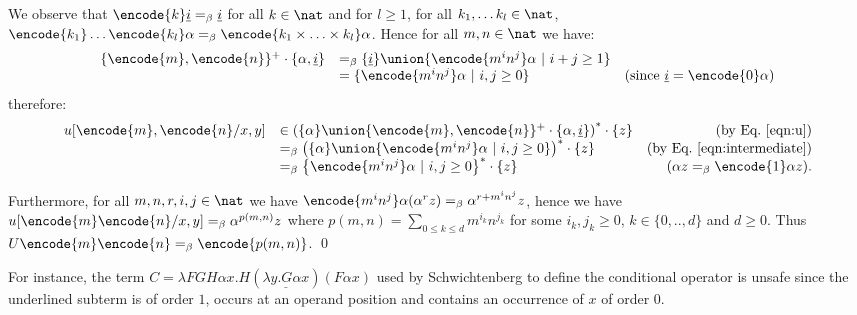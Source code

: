 We observe that $\encode{k} \underline{i} =_\beta \underline{i}$ for
all $k \in \nat$ and for $l\geq 1$, for all $k_1, \ldots k_l \in
\nat$, $\encode{k_1}\ldots \encode{k_l} \alpha =_\beta
\encode{k_1\times \ldots \times k_l} \alpha$. Hence for all $m,n \in
\nat$ we have:
\begin{equation}
\begin{array}{llr}
\{\encode{m},\encode{n}\}^+ \cdot \{\alpha, \underline{i} \} &=_\beta
\{ \underline{i} \} \union
\{ \encode{m^i n^j} \alpha \ |\ i+j \geq 1 \} \nonumber \\
&= \{ \encode{m^i n^j} \alpha \ |\ i,j \geq 0 \} & ( \mbox{since } \underline{i} = \encode{0} \alpha) \end{array}
\label{eqn:intermediate}
\end{equation}
therefore:
$$\begin{array}{llr}
u[\encode{m}, \encode{n}/x,y] &\in \left( \{ \alpha \} \union \{\encode{m},\encode{n}\}^+ \cdot \{\alpha, \underline{i} \} \right)^* \cdot \{ z \}  & \mbox{(by Eq.\ \ref{eqn:u})} \\
&=_\beta \left( \{\alpha \} \union \{ \encode{m^i n^j}
\alpha \ | \ i,j \geq 0 \} \right)^* \cdot \{ z \} & \mbox{(by Eq.\ \ref{eqn:intermediate})}  \\
&=_\beta \left\{ \encode{m^i n^j}
\alpha \ | \ i,j \geq 0 \right\}^* \cdot \{ z \} & \mbox{($\alpha z =_\beta \encode{1} \alpha z$)}.
\end{array}$$

Furthermore, for all $m,n,r,i,j\in \nat$ we have $\encode{m^i n^j}
\alpha (\alpha^r z) =_\beta \alpha^{r + m^i n^j} z$, hence
we have $u[\encode{m} \encode{n}/x,y] =_\beta \alpha^{p(m,n)} z$ where
$p(m,n) = \sum_{0\leq k \leq d} m^{i_k} n^{j_k}$ for some $i_k,j_k
\geq 0$, $k \in\{ 0,..,d \}$ and $d\geq 0$. Thus $U \encode{m}
\encode{n} =_\beta \encode{p(m,n)}$. \qed


For instance, the term $ C = \lambda F G H \alpha x . H (
\underline{\lambda y . G \alpha x} ) (F \alpha x)$ used by
Schwichtenberg \cite{citeulike:622637} to define the conditional
operator is unsafe since the underlined subterm is of order $1$,
occurs at an operand position and contains an occurrence of $x$ of
order $0$.






\newcommand{\zaioncencode}{\underline} %

\newcommand{\zaiwordtyp}{\mathbf{B}} %
\newcommand{\closedof}[1]{{\rm Cl}(#1)} %

